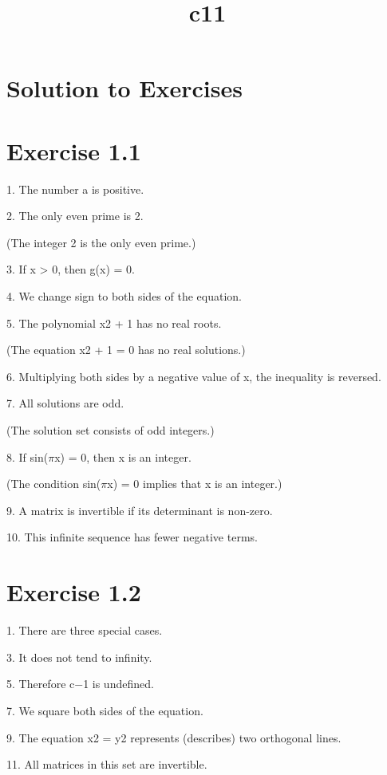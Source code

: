 \documentclass[11pt]{article}
\title{c11}
\date{}
\theoremstyle{plain}
\theoremstyle{definition}
\begin{document}
\maketitle

\section{Solution to Exercises}

\section{Exercise 1.1}

1. The number a is positive.

2. The only even prime is 2.

(The integer 2 is the only even prime.)

3. If x > 0, then g(x) = 0.

4. We change sign to both sides of the equation.

5. The polynomial x2 + 1 has no real roots.

(The equation x2 + 1 = 0 has no real solutions.)

6. Multiplying both sides by a negative value of x, the inequality is reversed.

7. All solutions are odd.

(The solution set consists of odd integers.)

8. If sin($\pi$x) = 0, then x is an integer.

(The condition sin($\pi$x) = 0 implies that x is an integer.)

9. A matrix is invertible if its determinant is non-zero.

10. This infinite sequence has fewer negative terms.

\section{Exercise 1.2}

1. There are three special cases.

3. It does not tend to infinity.

5. Therefore c$-$1 is undefined.

7. We square both sides of the equation.

9. The equation x2 = y2 represents (describes) two orthogonal lines.

11. All matrices in this set are invertible.
\end{document}
